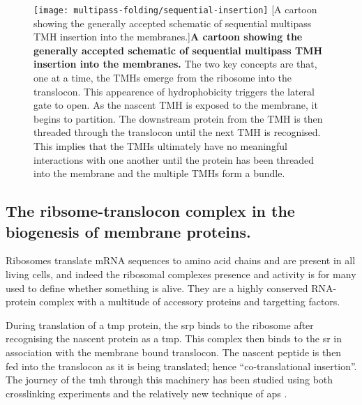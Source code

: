 \begin{figure}[!ht]
\centering
\texttt{[image: multipass-folding/sequential-insertion]}
        [A cartoon showing the generally accepted schematic of sequential multipass TMH insertion into the membranes.]{\textbf{A cartoon showing the generally accepted schematic of sequential multipass TMH insertion into the membranes.}
        The two key concepts are that, one at a time, the TMHs emerge from the ribosome into the translocon.
        This appearence of hydrophobicity triggers the lateral gate to open.
        As the nascent TMH is exposed to the membrane, it begins to partition.
        The downstream protein from the TMH is then threaded through the translocon until the next TMH is recognised.
        This implies that the TMHs ultimately have no meaningful interactions with one another until the protein has been threaded into the membrane and the multiple TMHs form a bundle.
}
\label{fig:sequential-insertion}
\end{figure}

\subsection{The ribsome-translocon complex in the biogenesis of membrane proteins.}
Ribosomes translate mRNA sequences to amino acid chains and are present in all living cells, and indeed the ribosomal complexes presence and activity is for many used to define whether something is alive.
They are a highly conserved RNA-protein complex with a multitude of accessory proteins and targetting factors.

During translation of a \gls{tmp} protein, the \gls{srp} binds to the ribosome after recognising the nascent protein as a \gls{tmp}.
This complex then binds to the \gls{sr} in association with the membrane bound translocon.
The nascent peptide is then fed into the translocon as it is being translated; hence ``co-translational insertion''.
The journey of the \gls{tmh} through this machinery has been studied using both crosslinking experiments and the relatively new technique of \gls{ap}s \cite{Cymer2015}.

